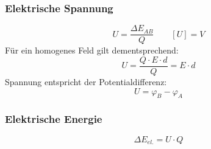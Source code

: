 \documentclass[12pt,a4paper,titlepage]{article}
\begin{document}
			\subsubsection{Elektrische Spannung}
				$$U = \frac{\Delta E_{AB}}{Q} \qquad [U] = V$$
				Für ein homogenes Feld gilt dementsprechend: \\
				$$U = \frac{Q \cdot E \cdot d}{Q} = E \cdot d$$
				Spannung entspricht der Potentialdifferenz: \\
				$$U = \varphi_B - \varphi_A$$
			\subsubsection{Elektrische Energie}
				$$\Delta E_{el.} = U \cdot Q$$
\end{document}
